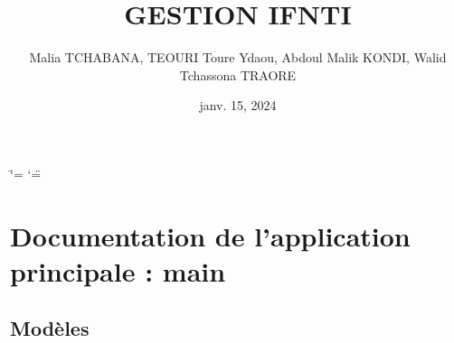 \documentclass[letterpaper,10pt,french]{sphinxmanual}
\title{GESTION IFNTI}
\date{janv. 15, 2024}
\author{Malia TCHABANA, TEOURI Toure Ydaou, Abdoul Malik KONDI, Walid Tchassona TRAORE}
\begin{document}
\ifdefined\shorthandoff
  \ifnum\catcode`\=\string=\active\shorthandoff{=}\fi
  \ifnum\catcode`\"=\active{}\fi
\fi

\pagestyle{empty}
\sphinxmaketitle
\pagestyle{plain}
\sphinxtableofcontents
\pagestyle{normal}
\label{\detokenize{index::doc}}


\sphinxstepscope


\chapter{Documentation de l’application principale : main}
\label{\detokenize{main/index:documentation-de-l-application-principale-main}}\label{\detokenize{main/index::doc}}
\sphinxstepscope


\section{Modèles}
\label{\detokenize{main/model:module-main.models}}\label{\detokenize{main/model:modeles}}\label{\detokenize{main/model::doc}}
\end{document}
